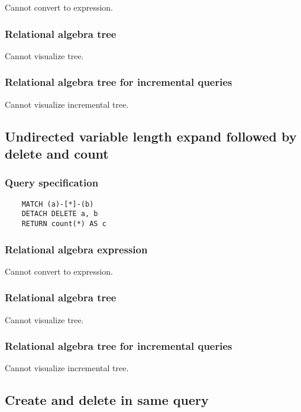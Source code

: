 	Cannot convert to expression.

	\subsubsection*{Relational algebra tree}

	Cannot visualize tree.

	\subsubsection*{Relational algebra tree for incremental queries}

	Cannot visualize incremental tree.
	\subsection{Undirected variable length expand followed by delete and count}

	\subsubsection*{Query specification}

	\begin{lstlisting}
	MATCH (a)-[*]-(b)
	DETACH DELETE a, b
	RETURN count(*) AS c
	\end{lstlisting}


	\subsubsection*{Relational algebra expression}

	Cannot convert to expression.

	\subsubsection*{Relational algebra tree}

	Cannot visualize tree.

	\subsubsection*{Relational algebra tree for incremental queries}

	Cannot visualize incremental tree.
	\subsection{Create and delete in same query}

